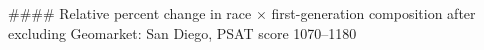 #### Relative percent change in race × first-generation composition after excluding Geomarket: San Diego, PSAT score 1070–1180
